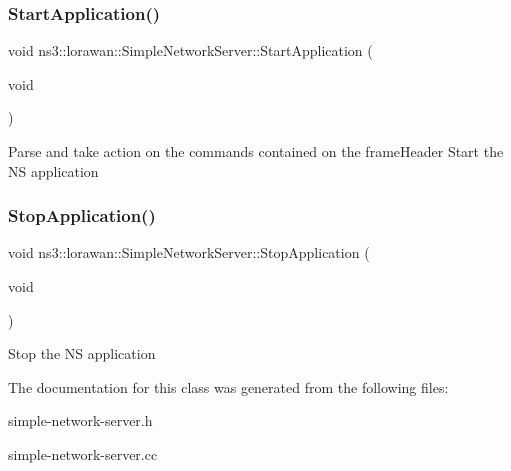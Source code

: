 \subsubsection{\texorpdfstring{Start\+Application()}{StartApplication()}}
{\footnotesize\ttfamily void ns3\+::lorawan\+::\+Simple\+Network\+Server\+::\+Start\+Application (\begin{DoxyParamCaption}\item[{void}]{ }\end{DoxyParamCaption})}

Parse and take action on the commands contained on the frame\+Header Start the NS application \mbox{\label{classns3_1_1lorawan_1_1SimpleNetworkServer_a95b9553d1da0447ca28f12e615a959d5}} 
\subsubsection{\texorpdfstring{Stop\+Application()}{StopApplication()}}
{\footnotesize\ttfamily void ns3\+::lorawan\+::\+Simple\+Network\+Server\+::\+Stop\+Application (\begin{DoxyParamCaption}\item[{void}]{ }\end{DoxyParamCaption})}

Stop the NS application 

The documentation for this class was generated from the following files\+:\begin{DoxyCompactItemize}
\item 
simple-\/network-\/server.\+h\item 
simple-\/network-\/server.\+cc\end{DoxyCompactItemize}
